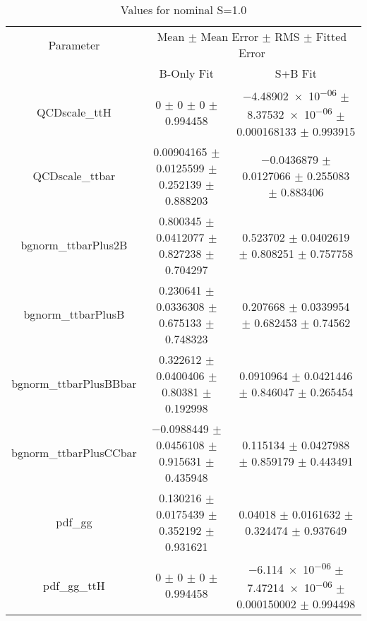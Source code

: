 \begin{table}
\centering
\caption{Values for nominal S=1.0}
\begin{tabular}{ccc}
\toprule
Parameter & \multicolumn{2}{c}{Mean $\pm$ Mean Error $\pm$ RMS $\pm$ Fitted Error}\\
 & B-Only Fit & S+B Fit\\
\midrule
QCDscale\_ttH & \num{0} $\pm$ \num{0} $\pm$ \num{0} $\pm$ \num{0.994458} & \num{-4.48902e-06} $\pm$ \num{8.37532e-06} $\pm$ \num{0.000168133} $\pm$ \num{0.993915}\\
QCDscale\_ttbar & \num{0.00904165} $\pm$ \num{0.0125599} $\pm$ \num{0.252139} $\pm$ \num{0.888203} & \num{-0.0436879} $\pm$ \num{0.0127066} $\pm$ \num{0.255083} $\pm$ \num{0.883406}\\
bgnorm\_ttbarPlus2B & \num{0.800345} $\pm$ \num{0.0412077} $\pm$ \num{0.827238} $\pm$ \num{0.704297} & \num{0.523702} $\pm$ \num{0.0402619} $\pm$ \num{0.808251} $\pm$ \num{0.757758}\\
bgnorm\_ttbarPlusB & \num{0.230641} $\pm$ \num{0.0336308} $\pm$ \num{0.675133} $\pm$ \num{0.748323} & \num{0.207668} $\pm$ \num{0.0339954} $\pm$ \num{0.682453} $\pm$ \num{0.74562}\\
bgnorm\_ttbarPlusBBbar & \num{0.322612} $\pm$ \num{0.0400406} $\pm$ \num{0.80381} $\pm$ \num{0.192998} & \num{0.0910964} $\pm$ \num{0.0421446} $\pm$ \num{0.846047} $\pm$ \num{0.265454}\\
bgnorm\_ttbarPlusCCbar & \num{-0.0988449} $\pm$ \num{0.0456108} $\pm$ \num{0.915631} $\pm$ \num{0.435948} & \num{0.115134} $\pm$ \num{0.0427988} $\pm$ \num{0.859179} $\pm$ \num{0.443491}\\
pdf\_gg & \num{0.130216} $\pm$ \num{0.0175439} $\pm$ \num{0.352192} $\pm$ \num{0.931621} & \num{0.04018} $\pm$ \num{0.0161632} $\pm$ \num{0.324474} $\pm$ \num{0.937649}\\
pdf\_gg\_ttH & \num{0} $\pm$ \num{0} $\pm$ \num{0} $\pm$ \num{0.994458} & \num{-6.114e-06} $\pm$ \num{7.47214e-06} $\pm$ \num{0.000150002} $\pm$ \num{0.994498}\\
\bottomrule
\end{tabular}
\end{table}